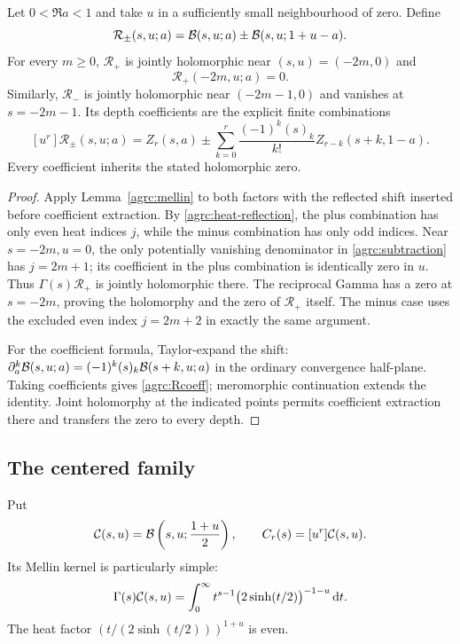 \begin{theorem}
\label{agrc:moving-reflection}
Let $0<\Re a<1$ and take $u$ in a sufficiently small neighbourhood of
zero. Define
\[
 \mathcal R_\pm(s,u;a)=\mathcal B(s,u;a)\pm\mathcal B(s,u;1+u-a).
\]
For every $m\geq0$, $\mathcal R_+$ is jointly holomorphic near
$(s,u)=(-2m,0)$ and
\begin{equation}\label{agrc:Rplus-zero}
 \mathcal R_+(-2m,u;a)=0.
\end{equation}
Similarly, $\mathcal R_-$ is jointly holomorphic near
$(-2m-1,0)$ and vanishes at $s=-2m-1$.
Its depth coefficients are the explicit finite combinations
\begin{equation}\label{agrc:Rcoeff}
 [u^r]\mathcal R_\pm(s,u;a)=
 Z_r(s,a)\pm\sum_{k=0}^r\frac{(-1)^k(s)_k}{k!}
                                  Z_{r-k}(s+k,1-a).
\end{equation}
Every coefficient inherits the stated holomorphic zero.
\end{theorem}
\begin{proof}
Apply Lemma~\ref{agrc:mellin} to both factors with the reflected shift
inserted before coefficient extraction. By \eqref{agrc:heat-reflection},
the plus combination has only even heat indices $j$, while the minus
combination has only odd indices. Near $s=-2m,u=0$, the only potentially
vanishing denominator in \eqref{agrc:subtraction} has $j=2m+1$; its
coefficient in the plus combination is identically zero in $u$.
Thus $\Gamma(s)\mathcal R_+$ is jointly holomorphic there. The reciprocal
Gamma has a zero at $s=-2m$, proving the holomorphy and the zero of
$\mathcal R_+$ itself. The minus case uses the excluded even index
$j=2m+2$ in exactly the same argument.

For the coefficient formula, Taylor-expand the shift:
$\partial_a^k\mathcal B(s,u;a)=(-1)^k(s)_k\mathcal B(s+k,u;a)$
in the ordinary convergence half-plane. Taking coefficients gives
\eqref{agrc:Rcoeff}; meromorphic continuation extends the identity.
Joint holomorphy at the indicated points permits coefficient extraction
there and transfers the zero to every depth.
\end{proof}

\subsection{The centered family}

Put
\begin{equation}\label{agrc:center-family}
 \mathcal C(s,u)=\mathcal B\left(s,u;\frac{1+u}{2}\right),
 \qquad C_r(s)=[u^r]\mathcal C(s,u).
\end{equation}
Its Mellin kernel is particularly simple:
\begin{equation}\label{agrc:center-Mellin}
 \Gamma(s)\mathcal C(s,u)=\int_0^\infty
               t^{s-1}\bigl(2\sinh(t/2)\bigr)^{-1-u}\,\mathrm d t.
\end{equation}
The heat factor
$(t/(2\sinh(t/2)))^{1+u}$ is even.

